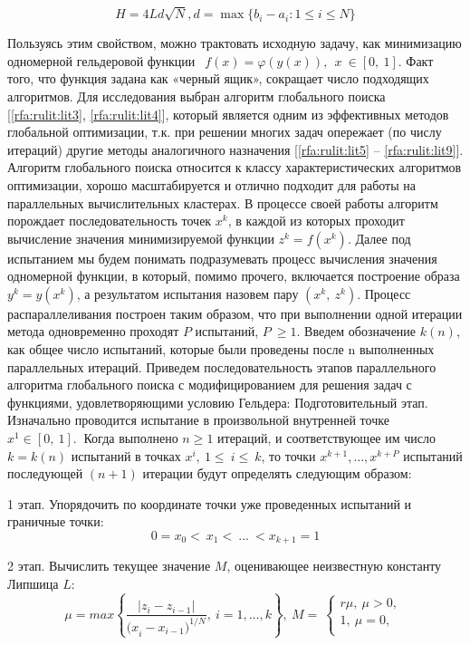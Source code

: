 \documentclass[10pt,a4paper]{book}
\begin{document}
\begin{equation}
H=4Ld\sqrt{N},d=\max\{b_i-a_i:1\leqslant i\leqslant N\}
\end{equation}
 
 
 Пользуясь этим свойством, можно трактовать исходную задачу, как минимизацию одномерной гельдеровой функции $\ \ f\left(x\right)=\varphi\left(y\left(x\right)\right),\ \ x\ \in[0,\ 1]$.
Факт того, что функция задана как «черный ящик», сокращает число подходящих алгоритмов. Для исследования выбран алгоритм глобального поиска [\ref{rfa:rulit:lit3}, \ref{rfa:rulit:lit4}], который является одним из эффективных методов глобальной оптимизации, т.к. при решении многих задач опережает (по числу итераций) другие методы аналогичного назначения [\ref{rfa:rulit:lit5} – \ref{rfa:rulit:lit9}]. Алгоритм глобального поиска относится к классу характеристических алгоритмов оптимизации, хорошо масштабируется и отлично подходит для работы на параллельных вычислительных кластерах. 
В процессе своей работы алгоритм порождает последовательность точек $x^k$, в каждой из которых проходит вычисление значения минимизируемой функции $z^k=f(x^k)$. Далее под испытанием мы будем понимать подразумевать процесс вычисления значения одномерной функции, в который, помимо прочего, включается построение образа $y^k=y(x^k)$, а результатом испытания назовем пару $(x^k,\ z^k)$. Процесс распараллеливания построен таким образом, что при выполнении одной итерации метода одновременно проходят $P$ испытаний, $P\ \geq1$. Введем обозначение $k(n)$, как общее число испытаний, которые были проведены после n выполненных параллельных итераций. Приведем последовательность этапов параллельного алгоритма глобального поиска с модифицированием для решения задач с функциями, удовлетворяющими условию Гельдера:
Подготовительный этап. Изначально проводится испытание в произвольной внутренней точке $x^1\in\left[0,\ 1\right].\ $ Когда выполнено $n\geq1$ итераций, и соответствующее им число $k=k(n)$ испытаний в точках $x^i,\ 1\le\ i\le\ k$, то точки $x^{k+1},\ldots,x^{k+P}$ испытаний последующей $(n+1)$ итерации будут определять следующим образом:

 1 этап. Упорядочить по координате точки уже проведенных испытаний и граничные точки:
 \begin{equation}
\label{agp1_sort}
	0=x_0<\ x_1<\ ...\ <x_{k+1}=1 
	\end{equation}
	
2 этап. Вычислить текущее значение $M$, оценивающее неизвестную константу Липшица $L$:
 \begin{equation}
\label{agp2_mu}
	\mu=max\left\{\frac{|z_i-z_{i-1}|}{{{(x}_i-x_{i-1})}^{1/N}},\ i=1,\ldots,k\right\},\ M=\ \left\{\begin{matrix}r\mu,\ \mu>0,\\1,\ \mu=0,\\\end{matrix}\right.\
		\end{equation}
\end{document}
